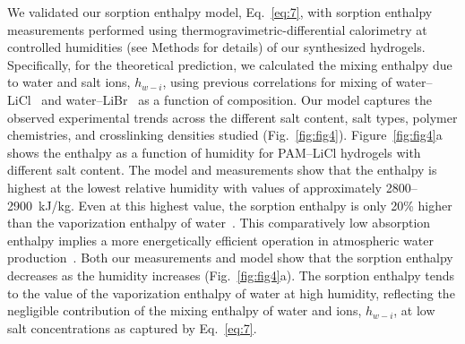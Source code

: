 \documentclass[11pt]{article}
\begin{document}
We validated our sorption enthalpy model, Eq.~\ref{eq:7}, with sorption enthalpy measurements performed using thermogravimetric-differential calorimetry at controlled humidities (see Methods for details) of our synthesized hydrogels. Specifically, for the theoretical prediction, we calculated the mixing enthalpy due to water and salt ions, $h_{w-i}$, using previous correlations for mixing of water--LiCl~\cite{conde2004} and water--LiBr~\cite{yuan2005} as a function of composition. Our model captures the observed experimental trends across the different salt content, salt types, polymer chemistries, and crosslinking densities studied (Fig.~\ref{fig:fig4}). Figure~\ref{fig:fig4}a shows the enthalpy as a function of humidity for PAM--LiCl hydrogels with different salt content. The model and measurements show that the enthalpy is highest at the lowest relative humidity with values of approximately 2800--2900~kJ/kg. Even at this highest value, the sorption enthalpy is only 20\% higher than the vaporization enthalpy of water~\cite{zhong2024,brannon1991}. This comparatively low absorption enthalpy implies a more energetically efficient operation in atmospheric water production~\cite{li2023,li2022}. Both our measurements and model show that the sorption enthalpy decreases as the humidity increases (Fig.~\ref{fig:fig4}a). The sorption enthalpy tends to the value of the vaporization enthalpy of water at high humidity, reflecting the negligible contribution of the mixing enthalpy of water and ions, $h_{w-i}$, at low salt concentrations as captured by Eq.~\ref{eq:7}.
\end{document}
